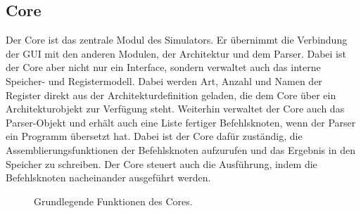 \subsection{Core}
\label{Dev-Kapitel: Core}

Der Core ist das zentrale Modul des Simulators. Er übernimmt die Verbindung der
GUI mit den anderen Modulen, der Architektur und dem Parser. Dabei ist der Core
aber nicht nur ein Interface, sondern verwaltet auch das interne Speicher- und
Registermodell. Dabei werden Art, Anzahl und Namen der Register direkt aus der
Architekturdefinition geladen, die dem Core über ein Architekturobjekt zur
Verfügung steht. Weiterhin verwaltet der Core auch das Parser-Objekt und erhält
auch eine Liste fertiger Befehlsknoten, wenn der Parser ein Programm übersetzt
hat. Dabei ist der Core dafür zuständig, die Assemblierungsfunktionen der
Befehlsknoten aufzurufen und das Ergebnis in den Speicher zu schreiben. Der Core
steuert auch die Ausführung, indem die Befehlsknoten nacheinander ausgeführt
werden.

\begin{figure}[H]
    \begin{center}
    \end{center}
    \caption{Grundlegende Funktionen des Cores.}
    \label{fig:core-overview}
\end{figure}

